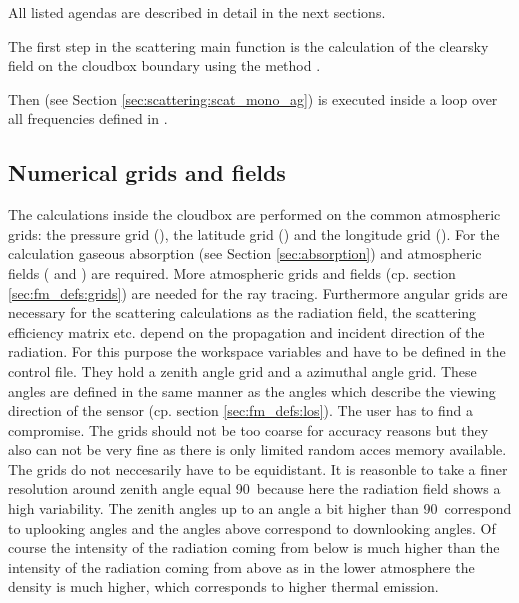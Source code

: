 All listed agendas are described in detail in the next sections.\\
\vspace*{1ex}

The first step in the scattering main function is the calculation of
the clearsky field on the cloudbox boundary using the method
.

Then (see Section
\ref{sec:scattering:scat_mono_ag}) is executed inside a loop over all frequencies
defined in .

\subsection{Numerical grids and fields}
\label{sec:scattering:grids}
The calculations inside the cloudbox are performed on the common
atmospheric grids: the pressure grid (), the
latitude grid () and the longitude grid
().  For the calculation gaseous absorption (see
Section \ref{sec:absorption}) and atmospheric fields
( and ) are required. More
atmospheric grids and fields (cp. section \ref{sec:fm_defs:grids}) are
needed for the ray tracing.  Furthermore angular grids are necessary
for the scattering calculations as the radiation field, the scattering
efficiency matrix etc. depend on the propagation and incident
direction of the radiation. For this purpose the workspace variables
 and  have to be
defined in the control file. They hold a zenith angle grid and a
azimuthal angle grid. These angles are defined in the same manner as
the angles which describe the viewing direction of the sensor (cp.
section \ref{sec:fm_defs:los}).  The user has to find a compromise.
The grids should not be too coarse for accuracy reasons but they also
can not be very fine as there is only limited random acces memory
available.  The grids do not neccesarily have to be equidistant. It is
reasonble to take a finer resolution around zenith angle equal
90\degree\ because here the radiation field shows a high variability.
The zenith angles up to an angle a bit higher than 90\degree\ 
correspond to uplooking angles and the angles above correspond to
downlooking angles. Of course the intensity of the radiation coming
from below is much higher than the intensity of the radiation coming
from above as in the lower atmosphere the density is much higher,
which corresponds to higher thermal emission.\newline

